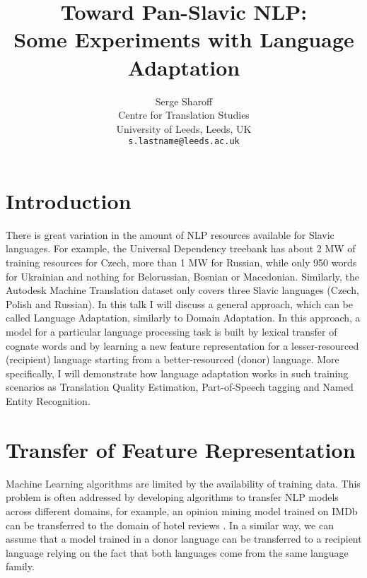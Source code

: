 \documentclass[11pt]{article}
\title{Toward Pan-Slavic NLP: \\
  Some Experiments with Language Adaptation}
\author{Serge Sharoff\\
  Centre for Translation Studies\\
  University of Leeds, Leeds, UK\\
  {\tt s.lastname@leeds.ac.uk} \\}
\date{}
\begin{document}
\maketitle

\section{Introduction}

There is great variation in the amount of NLP resources available for
Slavic languages. For example, the Universal Dependency treebank
\cite{nivre16} has about 2 MW of training resources for Czech, more than
1 MW for Russian, while only 950 words for Ukrainian and nothing for
Belorussian, Bosnian or Macedonian. Similarly, the Autodesk Machine
Translation dataset only covers three Slavic languages (Czech, Polish
and Russian).  In this talk I will discuss a general approach, which can
be called Language Adaptation, similarly to Domain Adaptation.  In this
approach, a model for a particular language processing task is built by
lexical transfer of cognate words and by learning a new feature
representation for a lesser-resourced (recipient) language starting from
a better-resourced (donor) language. More specifically, I will
demonstrate how language adaptation works in such training scenarios as
Translation Quality Estimation, Part-of-Speech tagging and Named Entity
Recognition.

\section{Transfer of Feature Representation}
Machine Learning algorithms are limited by the availability of training data.  This problem is often addressed by developing algorithms to transfer NLP models across different domains, for example, an opinion mining model trained on IMDb can be transferred to the domain of hotel reviews \cite{sogaard13}.  In a similar way, we can assume that a model trained in a donor language can be transferred to a recipient language relying on the fact that both languages come from the same language family. 
\end{document}
